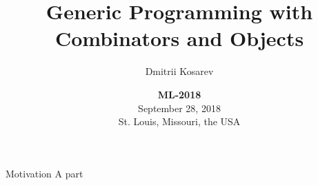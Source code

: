 \documentclass{beamer}
\title{Generic Programming with \\ Combinators and Objects}
\author{ Dmitrii Kosarev }
\institute[]{
  \textbf{
  St. Petersburg State University\\
  JetBrains Research}
}
\date{
   \vskip 1cm
   \small{
   \textbf{ML-2018}\\
   September 28, 2018 \\
   St. Louis, Missouri, the USA}
}
\theoremstyle{definition}
\theoremstyle{plain} %
\begin{document}
\begin{frame}[plain]
  \titlepage
\end{frame}


\begin{frame}[fragile]{Motivation}
A part 
\end{frame}

\begin{comment}
  The main idea in the area of datatype-generic programming is that a type can be used to derive a set of useful
  transformations of data of that type.
  
  A very common approach is to generate the implementation for the transformation of interest directly from the type definition. It's a powerful
  approach since it allows implementing a wide range of unrelated specific transformations in an ad hoc manner. On the other hand, every
  transformation has to be implemented in full from the scratch, and abstracting over such transformations is somewhat problematic, since they
  may not share common properties (for example, type).  
  
  Another approach is to develop a common representation for all types and implement a transformation of interest in
  terms of this representation. Thus, for a concrete type it becomes sufficient to translate the representation of a data in terms of its type
  into the representation in terms of representation of that type. Making new transformation becomes easier this way, but there is an essential
  performance penalty for re-encoding data representation (addressed in the relevant literature).

  Both approaches lack the same property: it is not possible to easy derive one transformation from another (or to reuse a part of already
  existing transformation). We argue, that this is a very frequent and important case, and, in addition, solving this problem would facilitate
  the application of generative approaches since it would make it possible to generate a wide range of ``default'' very generic transformations to
  derive the concrete ones from.

  In a parallel world of object-oriented programming this particular problem has long been solved: one just needs to inherit from
  an existing transformation and redefine it where needed. There are other problems with object-oriented languages (lack of convenient
  higher-order functions, overuse of objects (objects for abstraction, objects for polymorphism, etc.)), but this concrete problem
  is dealt with perfectly in object-oriented settings.


\end{comment}
\end{document}
